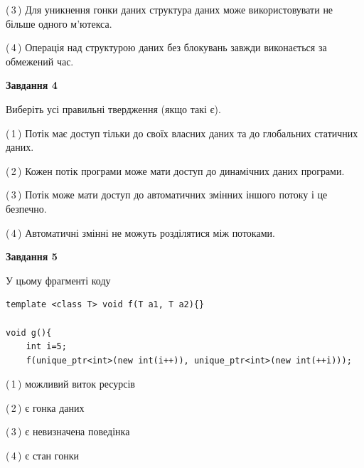 \documentclass[12pt, ukrainian]{article}
\begin{document}
\begin {large}
{(\,3\,) Для уникнення гонки даних структура даних може використовувати не більше одного м’ютекса.%

(\,4\,) Операція над структурою даних без блокувань завжди виконається за обмежений час.%



\begin{center}
\textbf{Завдання 4}
\end{center}
Виберіть усі правильні твердження (якщо такі є).\par
\vspace{2mm}

(\,1\,) Потік має доступ тільки до своїх власних даних та до глобальних статичних даних.%

(\,2\,) Кожен потік програми може мати доступ до динамічних даних програми.%

(\,3\,) Потік може мати доступ до автоматичних змінних іншого потоку і це безпечно.%

(\,4\,) Автоматичні змінні не можуть розділятися між потоками.%



\begin{center}
\textbf{Завдання 5}
\end{center}
У цьому фрагменті коду
\begin{verbatim}
template <class T> void f(T a1, T a2){}

void g(){
    int i=5;
    f(unique_ptr<int>(new int(i++)), unique_ptr<int>(new int(++i)));
\end{verbatim}

(\,1\,) можливий виток ресурсів%

(\,2\,) є гонка даних%

(\,3\,) є невизначена поведінка%

(\,4\,) є стан гонки%


}
\end {large}
\end{document}
